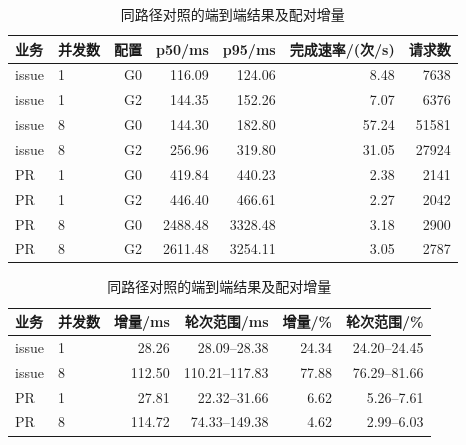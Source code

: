 \begin{table}[!htb]
\centering
\caption{同路径对照的端到端结果及配对增量}
\label{tab:overhead-business-rr022}
\small
\begin{tabular}{llrrrrr}
\toprule
业务 & 并发数 & 配置 & p50/ms & p95/ms & 完成速率/(次/s) & 请求数 \\
\midrule
issue & 1 & G0 & 116.09 & 124.06 & 8.48 & 7638 \\
issue & 1 & G2 & 144.35 & 152.26 & 7.07 & 6376 \\
issue & 8 & G0 & 144.30 & 182.80 & 57.24 & 51581 \\
issue & 8 & G2 & 256.96 & 319.80 & 31.05 & 27924 \\
PR & 1 & G0 & 419.84 & 440.23 & 2.38 & 2141 \\
PR & 1 & G2 & 446.40 & 466.61 & 2.27 & 2042 \\
PR & 8 & G0 & 2488.48 & 3328.48 & 3.18 & 2900 \\
PR & 8 & G2 & 2611.48 & 3254.11 & 3.05 & 2787 \\
\bottomrule
\end{tabular}
\par\medskip
\begin{tabular}{llrrrr}
\toprule
业务 & 并发数 & 增量/ms & 轮次范围/ms & 增量/\% & 轮次范围/\% \\
\midrule
issue & 1 & 28.26 & 28.09--28.38 & 24.34 & 24.20--24.45 \\
issue & 8 & 112.50 & 110.21--117.83 & 77.88 & 76.29--81.66 \\
PR & 1 & 27.81 & 22.32--31.66 & 6.62 & 5.26--7.61 \\
PR & 8 & 114.72 & 74.33--149.38 & 4.62 & 2.99--6.03 \\
\bottomrule
\end{tabular}
\par{}
\end{table}

